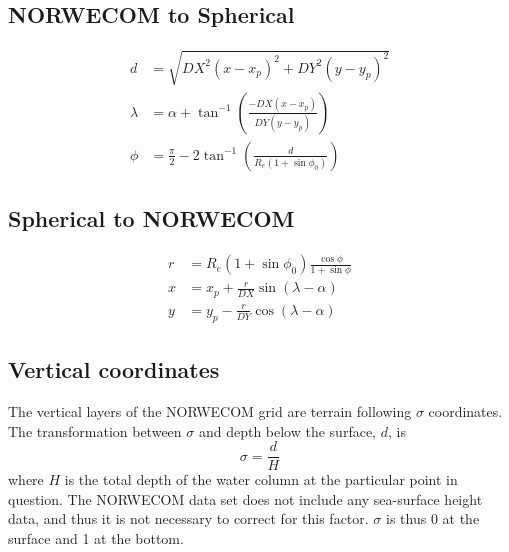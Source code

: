 \documentclass[a4paper,10pt]{article}
\begin{document}
\subsection{NORWECOM to Spherical}
\begin{equation}\label{eq:gr2sph}
\begin{aligned}
 d &= \sqrt{DX^2\left(x-x_p\right)^2 + DY^2\left(y-y_p\right)^2} \\
 \lambda &= \alpha + \tan^{-1}\left(\frac{-DX\left(x-x_p\right)}{DY\left(y-y_p\right)}\right) \\
 \phi &= \frac{\pi}{2} - 2\tan^{-1}\left(\frac{d}{R_e\left(1+\sin\phi_0\right)}\right) 
\end{aligned}\end{equation} 

\subsection{Spherical to NORWECOM}
\begin{equation}\label{eq:sph2gr}\begin{aligned}
r &=  R_e\left(1+\sin\phi_0\right)\frac{\cos\phi}{1+\sin\phi}  \\
x &= x_p + \frac{r}{DX} \sin\left(\lambda-\alpha\right) \\
y &= y_p - \frac{r}{DY} \cos\left(\lambda-\alpha\right) 
\end{aligned}\end{equation} 

\subsection{Vertical coordinates}
The vertical layers of the NORWECOM grid are terrain following $\sigma$ coordinates. The transformation between $\sigma$ and depth below the surface, $d$, is
\begin{equation}
  \sigma = \frac{d}{H}
\end{equation} 
where $H$ is the total depth of the water column at the particular point in question. The NORWECOM data set does not include any sea-surface height data, and thus it is not necessary to correct for this factor. $\sigma$ is thus 0 at the surface and 1 at the bottom.
\end{document}
